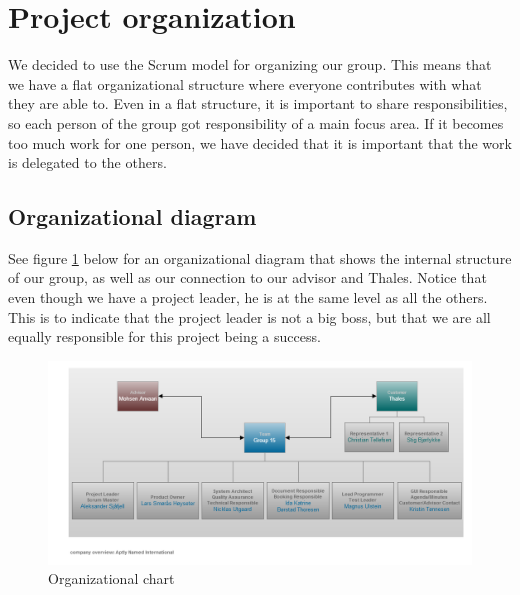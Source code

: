 

\section{Project organization}
We decided to use the Scrum model for organizing our group. This means that we have a flat organizational structure where everyone contributes with what they are able to. Even in a flat structure, it is important to share responsibilities, so each person of the group got responsibility of a main focus area. If it becomes too much work for one person, we have decided that it is important that the work is delegated to the others.

\subsection{Organizational diagram}
See figure \ref{fig:organizationalchart} below for an organizational diagram that shows the internal structure of our group, as well as our connection to our advisor and Thales. Notice that even though we have a project leader, he is at the same level as all the others. This is to indicate that the project leader is not a big boss, but that we are all equally responsible for this project being a success.
\begin{figure}[hbt]
\begin{center}
\includegraphics[width=\textwidth]{Organizational_Chart_v2}
\caption{Organizational chart} \label{fig:organizationalchart}
\end{center}
\end{figure}

\newpage


